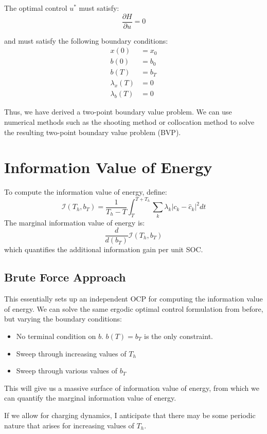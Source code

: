 \documentclass{article}
\begin{document}
The optimal control $u^*$ must satisfy:
\begin{equation}
   \frac{\partial H}{\partial u} = 0
\end{equation}

and must satisfy the following boundary conditions:
\begin{align}
   x(0) &= x_0 \\
   b(0) &= b_0 \\
   b(T) &= b_T \\
   \lambda_x(T) &= 0 \\
   \lambda_{b}(T) &= 0
\end{align}

Thus, we have derived a two-point boundary value problem. We can use numerical methods such as the shooting method or collocation method to solve the resulting two-point boundary value problem (BVP).

\section{Information Value of Energy}
To compute the information value of energy, define:
\begin{equation}
    \mathcal{I}(T_h, b_T) = \frac{1}{T_h - T} \int_T^{T+T_h} \sum_k \lambda_k \left| c_k - \hat{c}_k \right|^2 dt
\end{equation}
The marginal information value of energy is:
\begin{equation}
    \frac{d}{d (b_T)} \mathcal{I}(T_h, b_T)
\end{equation}
which quantifies the additional information gain per unit SOC.

\subsection{Brute Force Approach}
This essentially sets up an independent OCP for computing the information value of energy. We can solve the same ergodic optimal control formulation from before, but varying the boundary conditions:
\begin{itemize}
    \item No terminal condition on $b$. $b(T) = b_T$ is the only constraint.
    \item Sweep through increasing values of $T_h$
    \item Sweep through various values of $b_T$
\end{itemize}

This will give us a massive surface of information value of energy, from which we can quantify the marginal information value of energy.

If we allow for charging dynamics, I anticipate that there may be some periodic nature that arises for increasing values of $T_h$.



\end{document}

